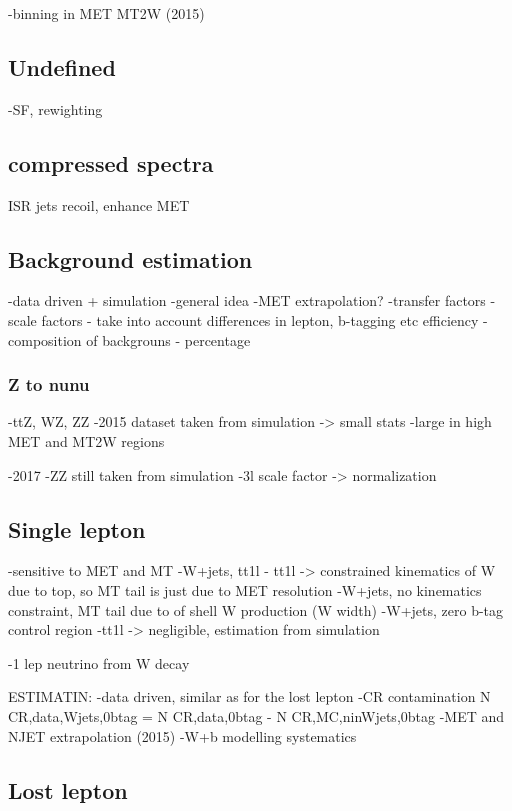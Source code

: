 -binning in
	MET
	MT2W (2015)
	

\subsection{Undefined}
-SF, rewighting

\subsection{compressed spectra}
	ISR jets
	recoil, enhance MET

\subsection{Background estimation}

-data driven + simulation
-general idea
-MET extrapolation?
-transfer factors
-scale factors - take into account differences in lepton, b-tagging etc efficiency
-composition of backgrouns - percentage

\subsubsection{Z to nunu}

-ttZ, WZ, ZZ
-2015 dataset taken from simulation -> small stats
-large in high MET and MT2W regions

-2017
-ZZ still taken from simulation
-3l scale factor -> normalization

\subsection{Single lepton}

-sensitive to MET and MT
-W+jets, tt1l
- tt1l -> constrained kinematics of W due to top, so MT tail is just due to MET resolution
-W+jets, no kinematics constraint, MT tail due to of shell W production (W width) 
-W+jets, zero b-tag control region
-tt1l -> negligible, estimation from simulation

-1 lep neutrino from W decay

ESTIMATIN:
-data driven, similar as for the lost lepton
-CR contamination N CR,data,Wjets,0btag = N CR,data,0btag - N CR,MC,ninWjets,0btag
-MET and NJET extrapolation (2015)
-W+b modelling systematics

\subsection{Lost lepton}

